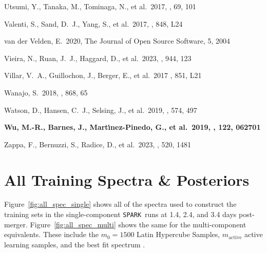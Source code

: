 \documentclass[twocolumn,twocolappendix]{aastex63}
\def\SPARK{\texttt{SPARK}}
\begin{document}
{{\begin{thebibliography}{}
 Utsumi, Y., Tanaka, M., Tominaga, N., et al.\ 2017, \pasj, 69, 101


 Valenti, S., Sand, D.~J., Yang, S., et al.\ 2017, \apjl, 848, L24


 van der Velden, E.\ 2020, The Journal of Open Source Software, 5, 2004


 Vieira, N., Ruan, J.~J., Haggard, D., et al.\ 2023, \apj, 944, 123


Villar, V.~A., Guillochon, J., Berger, E., et al.\ 2017 \aj, 851, L21


 Wanajo, S.\ 2018, \apj, 868, 65


 Watson, D., Hansen, C.~J., Selsing, J., et al.\ 2019, \nat, 574, 497


 \textbf{Wu, M.-R., Barnes, J., Mart{\'\i}nez-Pinedo, G., et al.\ 2019, \prl, 122, 062701}


 Zappa, F., Bernuzzi, S., Radice, D., et al.\ 2023, \mnras, 520, 1481


\end{thebibliography}


\appendix{}

\section{All Training Spectra \& Posteriors}\label{app:allspec_posteriors}

Figure~\ref{fig:all_spec_single} shows all of the spectra used to construct the training sets in the single-component \SPARK~runs at 1.4, 2.4, and 3.4 days post-merger. Figure~\ref{fig:all_spec_multi} shows the same for the multi-component equivalents. These include the $m_0 = 1500$ Latin Hypercube Samples, $m_{\mathrm{active}}$ active learning samples, and the best fit spectrum \edit1{for each \SPARK~run}.

}}
\end{document}
